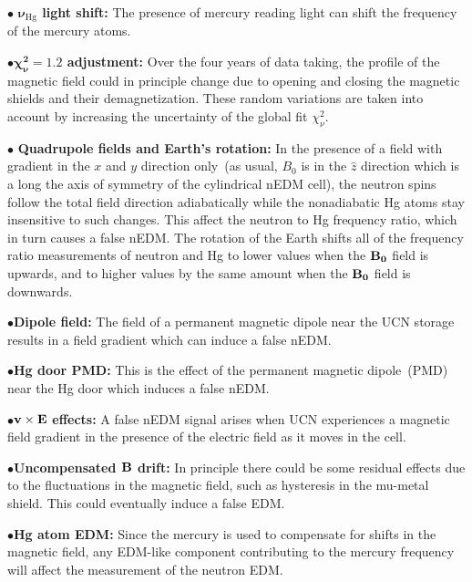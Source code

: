 \begin{description}
\item{ $\bullet$ \bf{$\boldsymbol{\nu_{\mathrm{Hg}}}$ light shift:}}
  The presence of mercury reading light can shift the frequency of the
  mercury atoms.
  
\item{$\bullet$\bf{$\boldsymbol{\chi_{\nu}^2 = 1.2}$ adjustment:}}
  Over the four years of data taking, the profile of the magnetic
  field could in principle change due to opening and closing the
  magnetic shields and their demagnetization. These random variations
  are taken into account by increasing the uncertainty of the global
  fit $\chi^2_{\nu}$.
  
\item{$\bullet$ \bf{Quadrupole fields and Earth's rotation:}} In the
  presence of a field with gradient in the $x$ and $y$ direction
  only~(as usual, $B_0$ is in the $\hat{z}$ direction which is a long
  the axis of symmetry of the cylindrical nEDM cell), the neutron
  spins follow the total field direction adiabatically while the
  nonadiabatic Hg atoms stay insensitive to such changes. This affect
  the neutron to Hg frequency ratio, which in turn causes a false
  nEDM. The rotation of the Earth shifts all of the frequency ratio
  measurements of neutron and Hg to lower values when the $\bf{B_0}$
  field is upwards, and to higher values by the same amount when the
  $\bf{B_0}$ field is downwards.
  
\item{$\bullet$\bf{Dipole field:}} The field of a permanent magnetic
  dipole near the UCN storage results in a field gradient which can
  induce a false nEDM.

\item{$\bullet$\bf{Hg door PMD:}} This is the effect of the permanent
  magnetic dipole~(PMD) near the Hg door which induces a false nEDM.
  
\item{$\bullet$$\bf{v}\times\bf{E}$ \bf{effects}:} A false nEDM signal
  arises when UCN experiences a magnetic field gradient in the
  presence of the electric field as it moves in the cell.

\item{$\bullet$\bf{Uncompensated
      $\bf{B}$ drift:}} In principle there could be some residual
  effects due to the fluctuations in the magnetic field, such as
  hysteresis in the mu-metal shield. This could eventually induce a
  false EDM.

\item{$\bullet$\bf{Hg atom EDM:}} Since the mercury is used to
  compensate for shifts in the magnetic field, any EDM-like component
  contributing to the mercury frequency will affect the measurement of
  the neutron EDM.


\end{description}
